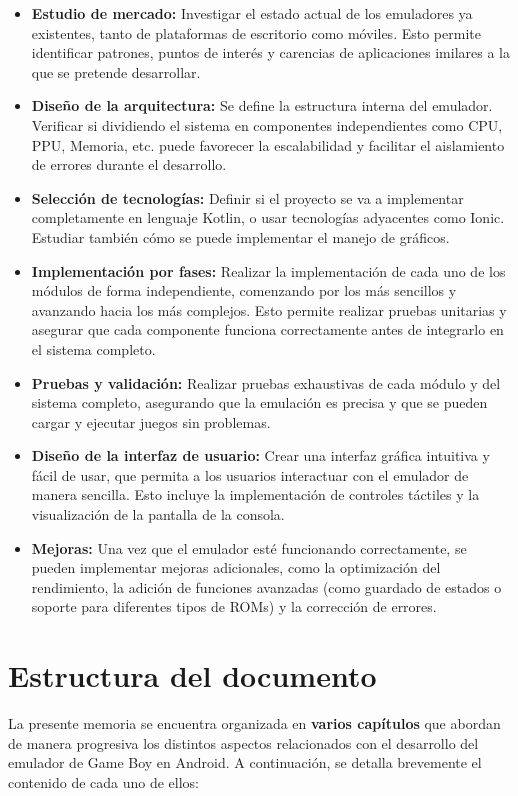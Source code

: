 \begin{itemize}
    \item \textbf{Estudio de mercado:} Investigar el estado actual de los emuladores ya existentes, tanto de plataformas de escritorio como móviles. Esto permite identificar patrones, puntos de interés y carencias de aplicaciones imilares a la que se pretende desarrollar.
    \item \textbf{Diseño de la arquitectura:} Se define la estructura interna del emulador. Verificar si dividiendo el sistema en componentes independientes como CPU, PPU, Memoria, etc. puede favorecer la escalabilidad y facilitar el aislamiento de errores durante el desarrollo.
    \item \textbf{Selección de tecnologías:} Definir si el proyecto se va a implementar completamente en lenguaje Kotlin, o usar tecnologías adyacentes como Ionic. Estudiar también cómo se puede implementar el manejo de gráficos.
    \item \textbf{Implementación por fases:} Realizar la implementación de cada uno de los módulos de forma independiente, comenzando por los más sencillos y avanzando hacia los más complejos. Esto permite realizar pruebas unitarias y asegurar que cada componente funciona correctamente antes de integrarlo en el sistema completo.
    \item \textbf{Pruebas y validación:} Realizar pruebas exhaustivas de cada módulo y del sistema completo, asegurando que la emulación es precisa y que se pueden cargar y ejecutar juegos sin problemas.
    \item \textbf{Diseño de la interfaz de usuario:} Crear una interfaz gráfica intuitiva y fácil de usar, que permita a los usuarios interactuar con el emulador de manera sencilla. Esto incluye la implementación de controles táctiles y la visualización de la pantalla de la consola.
    \item \textbf{Mejoras:} Una vez que el emulador esté funcionando correctamente, se pueden implementar mejoras adicionales, como la optimización del rendimiento, la adición de funciones avanzadas (como guardado de estados o soporte para diferentes tipos de ROMs) y la corrección de errores.
\end{itemize}

\section{Estructura del documento}
La presente memoria se encuentra organizada en \textbf{varios capítulos} que abordan de manera progresiva los distintos aspectos relacionados con el desarrollo del emulador de Game Boy en Android. A continuación, se detalla brevemente el contenido de cada uno de ellos:

